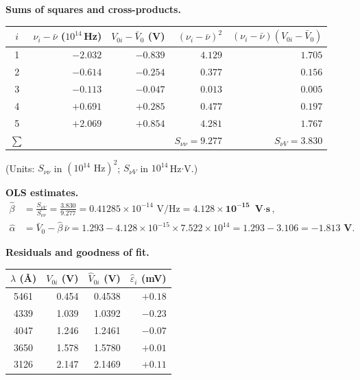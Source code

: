 \documentclass[12pt]{article}
\begin{document}
\medskip\noindent\textbf{Sums of squares and cross-products.}

\begin{center}
\begin{tabular}{c|rrrr}
\toprule
$i$ & $\nu_i - \bar\nu$ ($10^{14}$\,Hz) & $V_{0i} - \bar V_0$ (V)
  & $(\nu_i-\bar\nu)^2$ & $(\nu_i-\bar\nu)(V_{0i}-\bar V_0)$ \\
\midrule
1 & $-2.032$ & $-0.839$ & $4.129$ & $1.705$ \\
2 & $-0.614$ & $-0.254$ & $0.377$ & $0.156$ \\
3 & $-0.113$ & $-0.047$ & $0.013$ & $0.005$ \\
4 & $+0.691$ & $+0.285$ & $0.477$ & $0.197$ \\
5 & $+2.069$ & $+0.854$ & $4.281$ & $1.767$ \\
\midrule
$\sum$ & & & $S_{\nu\nu} = 9.277$ & $S_{\nu V} = 3.830$ \\
\bottomrule
\end{tabular}
\end{center}

\noindent(Units: $S_{\nu\nu}$ in $(10^{14}\text{ Hz})^2$;
$S_{\nu V}$ in $10^{14}$\,Hz$\cdot$V.)

\medskip\noindent\textbf{OLS estimates.}
\begin{align}
  \hat\beta &= \frac{S_{\nu V}}{S_{\nu\nu}}
             = \frac{3.830}{9.277}
             = \mathbf{0.41285}\times10^{-14}\text{ V/Hz}
             = \mathbf{4.128\times10^{-15}\text{ V$\cdot$s}},
             \label{eq:betahat_num} \\
  \hat\alpha &= \bar V_0 - \hat\beta\,\bar\nu
             = 1.293 - 4.128\times10^{-15}\times7.522\times10^{14}
             = 1.293 - 3.106 = \mathbf{-1.813\text{ V}}.
             \label{eq:alphahat_num}
\end{align}

\medskip\noindent\textbf{Residuals and goodness of fit.}

\begin{center}
\begin{tabular}{c|rrr}
\toprule
$\lambda$ (\AA) & $V_{0i}$ (V) & $\hat V_{0i}$ (V) & $\hat\varepsilon_i$ (mV) \\
\midrule
5461 & 0.454 & 0.4538 & $+0.18$ \\
4339 & 1.039 & 1.0392 & $-0.23$ \\
4047 & 1.246 & 1.2461 & $-0.07$ \\
3650 & 1.578 & 1.5780 & $+0.01$ \\
3126 & 2.147 & 2.1469 & $+0.11$ \\
\bottomrule
\end{tabular}
\end{center}
\end{document}
